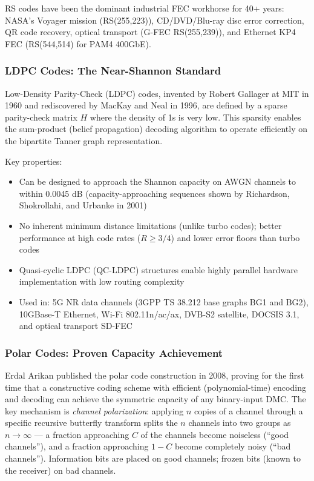 \documentclass[11pt,letterpaper]{article}
\begin{document}
RS codes have been the dominant industrial FEC workhorse for 40+ years: NASA's Voyager mission (RS(255,223)), CD/DVD/Blu-ray disc error correction, QR code recovery, optical transport (G-FEC RS(255,239)), and Ethernet KP4 FEC (RS(544,514) for PAM4 400GbE).

\subsubsection{LDPC Codes: The Near-Shannon Standard}

Low-Density Parity-Check (LDPC) codes, invented by Robert Gallager at MIT in 1960 and rediscovered by MacKay and Neal in 1996, are defined by a sparse parity-check matrix $H$ where the density of 1s is very low. This sparsity enables the sum-product (belief propagation) decoding algorithm to operate efficiently on the bipartite Tanner graph representation.

Key properties:
\begin{itemize}[leftmargin=*]
  \item Can be designed to approach the Shannon capacity on AWGN channels to within 0.0045 dB (capacity-approaching sequences shown by Richardson, Shokrollahi, and Urbanke in 2001)
  \item No inherent minimum distance limitations (unlike turbo codes); better performance at high code rates ($R \geq 3/4$) and lower error floors than turbo codes
  \item Quasi-cyclic LDPC (QC-LDPC) structures enable highly parallel hardware implementation with low routing complexity
  \item Used in: 5G NR data channels (3GPP TS 38.212 base graphs BG1 and BG2), 10GBase-T Ethernet, Wi-Fi 802.11n/ac/ax, DVB-S2 satellite, DOCSIS 3.1, and optical transport SD-FEC
\end{itemize}

\subsubsection{Polar Codes: Proven Capacity Achievement}

Erdal Arikan published the polar code construction in 2008, proving for the first time that a constructive coding scheme with efficient (polynomial-time) encoding and decoding can achieve the symmetric capacity of any binary-input DMC. The key mechanism is \textit{channel polarization}: applying $n$ copies of a channel through a specific recursive butterfly transform splits the $n$ channels into two groups as $n \to \infty$ --- a fraction approaching $C$ of the channels become noiseless (``good channels''), and a fraction approaching $1-C$ become completely noisy (``bad channels''). Information bits are placed on good channels; frozen bits (known to the receiver) on bad channels.
\end{document}
